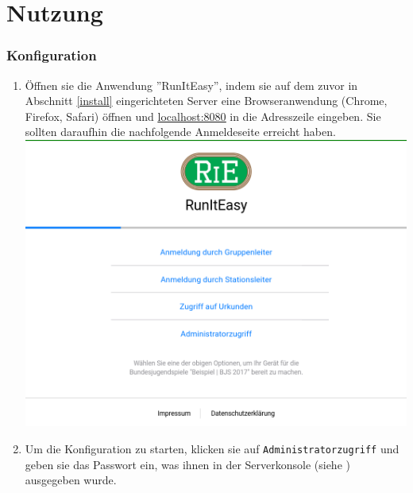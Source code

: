 \documentclass[11pt,a4paper,titlepage,german]{article}
\begin{document}
	\newpage
		
	\part{Nutzung}
		\section{Konfiguration}
			\begin{enumerate}
				\item Öffnen sie die Anwendung ''RunItEasy'', indem sie auf dem zuvor in Abschnitt \ref{install} eingerichteten Server eine Browseranwendung (Chrome, Firefox, Safari) öffnen und \href{http://localhost:8080/}{\underline{\color{blue}localhost:8080}} in die Adresszeile eingeben. Sie sollten daraufhin die nachfolgende Anmeldeseite erreicht haben.\\
				\includegraphics[width=\textwidth]{Login}
				
				\item Um die Konfiguration zu starten, klicken sie auf \texttt{Administratorzugriff} und geben sie das Passwort ein, was ihnen in der Serverkonsole (siehe ) ausgegeben wurde.
				

\end{enumerate}
\end{document}
